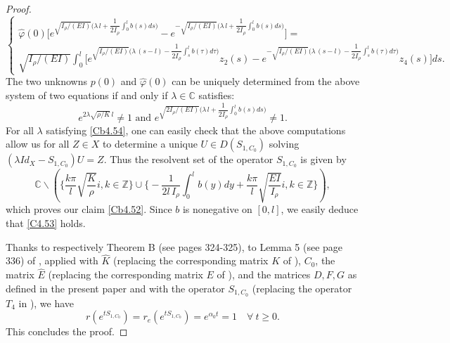 \documentclass[10pt, english]{article}
\begin{document}
{\begin{proof}
$$\begin{cases}
\widehat{\varphi}(0) \Big [e^{\sqrt{I_{\rho}/(EI)} \Big(\lambda \,l + \dfrac{1}{2I_{\rho}} \int_0^l b(s)ds\Big)} - e^{-\sqrt{I_{\rho}/(EI)} \Big(\lambda \,l + \dfrac{1}{2I_{\rho}} \int_0^l b(s)ds\Big)
}\Big ]= \\
\sqrt{I_{\rho}/(EI)} \int_0^l \Big [
e^{\sqrt{I_{\rho}/(EI)} \Big(\lambda \,(s-l) - \dfrac{1}{2I_{\rho}} \int_s^l b(\tau)d\tau\Big)} z_2(s) -
e^{-\sqrt{I_{\rho}/(EI)} \Big(\lambda \,(s-l) - \dfrac{1}{2I_{\rho}} \int_s^l b(\tau)d\tau\Big)} z_4(s)
\Big ]ds.
\end{cases}
$$
The two unknowns $p(0)$ and $\widehat{\varphi}(0)$ can be uniquely determined from the above system of two equations if and only if $\lambda \in \mathbb{C}$ satisfies:
\begin{equation}\label{Cb4.54}
e^{2\lambda \sqrt{\rho/K} \, l} \neq 1 \mbox{ and } e^{\sqrt{2I_{\rho}/(EI)} \Big(\lambda \,l + \dfrac{1}{2I_{\rho}} \int_0^l b(s)ds\Big)} \neq 1.
\end{equation}
For all $\lambda$ satisfying \eqref{Cb4.54}, one can easily check that the above computations allow us for all $Z \in X$ to determine a unique $U \in D(S_{1,C_0})$ solving
$(\lambda Id_X - S_{1,C_0})U=Z$. 
Thus the resolvent set of the operator $S_{1,C_0}$ is given by
$$
\mathbb{C} \backslash (\Big\{\dfrac{k\pi }{l} \sqrt{\dfrac{K}{\rho}} i, k \in \mathbb{Z}\Big\} \cup \Big\{- \dfrac{1}{2l \,I_{\rho}} \int_0^l b(y)dy +  \dfrac{k\pi }{l} \sqrt{\dfrac{E I }{I_{\rho}}} i, k \in \mathbb{Z}\Big\}),
$$
which proves our claim \eqref{Cb4.52}. Since $b$ is nonegative on $[0,l]$, we easily deduce that \eqref{C4.53} holds. 

Thanks to respectively Theorem B (see pages 324-325), to Lemma 5 (see page 336) of \cite{NRL1986}, applied with $\widehat{K}$ (replacing the corresponding matrix $K$ of \cite{NRL1986}), $C_0$, the matrix $\widehat{E}$ (replacing the corresponding matrix $E$ of \cite{NRL1986}), and the matrices $D, F, G$ as defined in the present paper and with the operator $S_{1,C_0}$ (replacing the operator $T_4$ in \cite{NRL1986}), we have
$$
r(e^{tS_{1,C_0}})=r_e(e^{tS_{1,C_0}})=e^{\alpha_0 t}=1 \quad \forall \ t \geqslant 0.
$$
This concludes the proof.
\end{proof}

}
\end{document}

